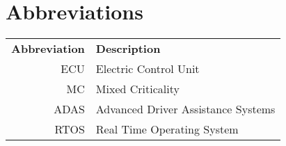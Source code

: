 \chapter*{Abbreviations}
\noindent{}\begin{tabular}{r  l}
\textbf{Abbreviation} 	& \textbf{Description} \vspace{.5em} \\
ECU		&Electric Control Unit\\
MC		&Mixed Criticality\\
ADAS	&Advanced Driver Assistance Systems\\
RTOS	&Real Time Operating System\\
\end{tabular}